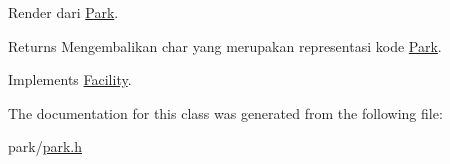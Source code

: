 Render dari \hyperlink{classPark}{Park}. 

\begin{DoxyReturn}{Returns}
Mengembalikan char yang merupakan representasi kode \hyperlink{classPark}{Park}. 
\end{DoxyReturn}


Implements \hyperlink{classFacility_a177b3f9cd142fe4521c1d15b00d3675c}{Facility}.



The documentation for this class was generated from the following file\+:\begin{DoxyCompactItemize}
\item 
park/\hyperlink{park_8h}{park.\+h}\end{DoxyCompactItemize}
